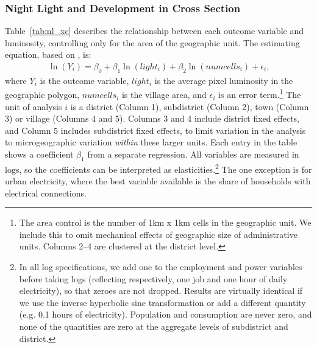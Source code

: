 \documentclass[12pt,letterpaper]{article}
\begin{document}
\subsubsection*{Night Light and Development in Cross Section}

Table~\ref{tab:nl_xc} describes the relationship between each outcome
variable and luminosity, controlling only for the area of the
geographic unit. The estimating equation, based on
, is:
%
\begin{align}
  \label{eq:nl_xc}
  \ln(Y_i) = \beta_0 + \beta_1 \ln(light_i) + \beta_2 \ln(numcells_i) + \epsilon_i\text{,}
\end{align}
%
\noindent where $Y_i$ is the outcome variable, $light_i$ is the
average pixel luminosity in the geographic polygon, $numcells_i$ is
the village area, and $\epsilon_i$ is an error term.\footnote{The area
  control is the number of 1km x 1km cells in the geographic unit. We
  include this to omit mechanical effects of geographic size of
  administrative units. Columns 2--4 are clustered at the district
  level.} The unit of analysis $i$ is a district (Column 1),
subdistrict (Column 2), town (Column 3) or village (Columns 4 and
5). Columns 3 and 4 include district fixed effects, and Column 5
includes subdistrict fixed effects, to limit variation in the analysis
to microgeographic variation \textit{within} these larger units. Each
entry in the table shows a coefficient $\beta_1$ from a separate
regression. All variables are measured in logs, so the coefficients
can be interpreted as elasticities.\footnote{In all log
  specifications, we add one to the employment and power variables
  before taking logs (reflecting respectively, one job and one hour of
  daily electricity), so that zeroes are not dropped. Results are
  virtually identical if we use the inverse hyperbolic sine
  transformation or add a different quantity (e.g. 0.1 hours of
  electricity). Population and consumption are never zero, and none of
  the quantities are zero at the aggregate levels of subdistrict and
  district.} The one exception is for urban electricity, where the
best variable available is the share of households with electrical
connections.
\end{document}
